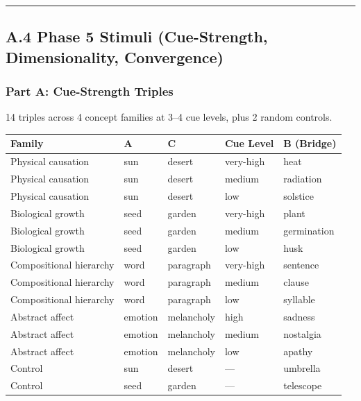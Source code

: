 \begin{center}\rule{0.5\linewidth}{0.5pt}\end{center}

\subsection{A.4 Phase 5 Stimuli (Cue-Strength, Dimensionality, Convergence)}\label{a.4-phase-5-stimuli-cue-strength-dimensionality-convergence}

\subsubsection{Part A: Cue-Strength Triples}\label{part-a-cue-strength-triples}

14 triples across 4 concept families at 3--4 cue levels, plus 2 random controls.

\begin{longtable}[]{@{}lllll@{}}
\toprule\noalign{}
Family & A & C & Cue Level & B (Bridge) \\
\midrule\noalign{}
\endhead
\bottomrule\noalign{}
\endlastfoot
Physical causation & sun & desert & very-high & heat \\
Physical causation & sun & desert & medium & radiation \\
Physical causation & sun & desert & low & solstice \\
Biological growth & seed & garden & very-high & plant \\
Biological growth & seed & garden & medium & germination \\
Biological growth & seed & garden & low & husk \\
Compositional hierarchy & word & paragraph & very-high & sentence \\
Compositional hierarchy & word & paragraph & medium & clause \\
Compositional hierarchy & word & paragraph & low & syllable \\
Abstract affect & emotion & melancholy & high & sadness \\
Abstract affect & emotion & melancholy & medium & nostalgia \\
Abstract affect & emotion & melancholy & low & apathy \\
Control & sun & desert & --- & umbrella \\
Control & seed & garden & --- & telescope \\
\end{longtable}

